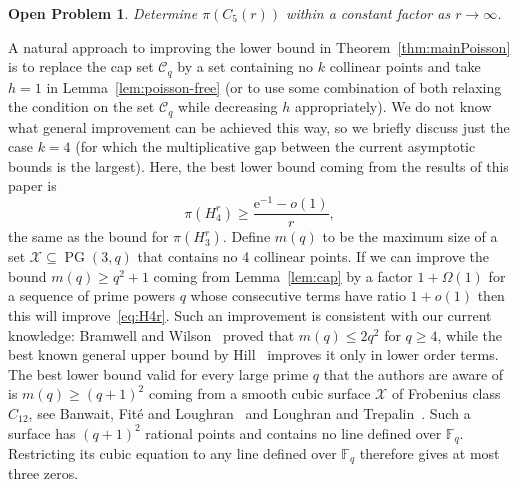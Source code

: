 \documentclass[12pt,a4paper]{article}
\numberwithin{equation}{section}
\newtheorem{problem}[theorem]{Open Problem}
\theoremstyle{definition}
\theoremstyle{remark}
\newcommand{\me}{\mathrm{e}}
\begin{document}
\begin{problem} Determine $\pi(C_5(r))$ within a constant factor as $r\to \infty$.\end{problem}

A natural approach to improving the lower bound in Theorem~\ref{thm:mainPoisson} is to replace the cap set $\mathcal C_q$ by a set containing no $k$ collinear points and take $h=1$ in Lemma~\ref{lem:poisson-free} (or to use some combination of both relaxing the condition on the set $\mathcal C_q$ while decreasing $h$ appropriately). We do not know what general improvement can be achieved this way, so we briefly discuss just the case $k=4$ (for which the multiplicative gap between the current asymptotic bounds is the largest). Here, the best lower bound coming from the results of this paper is 
 \begin{equation}\label{eq:H4r}
 \pi(H_4^r)\ge \frac{\me^{-1}-o(1)}r,
 \end{equation} the same as the bound for $\pi(H_3^r)$. Define $m(q)$ to be the maximum size of a set $\mathcal X\subseteq \operatorname{PG}(3,q)$ that contains no 4 collinear points. If we can improve the bound $m(q)\ge q^2+1$ coming from Lemma~\ref{lem:cap} by a factor $1+\Omega(1)$ for a sequence of prime powers $q$ whose consecutive terms have ratio $1+o(1)$ then this will improve~\eqref{eq:H4r}. Such an improvement is consistent with our current knowledge:  Bramwell and Wilson~\cite{BramwellWilson73} proved that $m(q)\le 2q^2$ for $q\ge4$, while the best known general upper bound by Hill~\cite{Hill78} improves it only in lower order terms. The best  lower bound valid for every large prime $q$ that the authors are aware of is $m(q)\ge (q+1)^2$ coming from a smooth cubic surface $\mathcal X$ of Frobenius class $C_{12}$, see Banwait, Fit\'e and Loughran~\cite[Eq.~(2.1) and Table~7.1]{BanwaitFiteLoughran19} and Loughran and Trepalin~\cite[Theorem~1.1]{LoughranTrepalin20}. Such a surface has $(q+1)^2$ rational points and contains no line defined over $\mathbb F_q$. Restricting its cubic equation to any line defined over $\mathbb F_q$ therefore gives at most three zeros.
\end{document}
